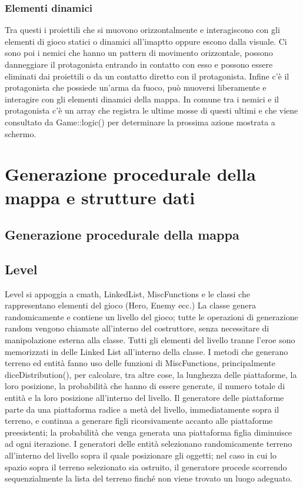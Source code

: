 \documentclass[12pt]{article}
\begin{document}
\subsubsection{Elementi dinamici}
Tra questi i proiettili che si muovono orizzontalmente e interagiscono con gli elementi di gioco statici o dinamici all'imaptto oppure escono dalla visuale.
Ci sono poi i nemici che hanno un pattern di movimento orizzontale, possono danneggiare il protagonista entrando in contatto con esso e possono essere eliminati dai proiettili o da un contatto diretto con il protagonista.
Infine c'è il protagonista che possiede un'arma da fuoco, può muoversi liberamente e interagire con gli elementi dinamici della mappa.
In comune tra i nemici e il protagonista c'è un array che registra le ultime mosse di questi ultimi e che viene consultato da Game::logic() per determinare la prossima azione mostrata a schermo.

\section*{Generazione procedurale della mappa e strutture dati}
\subsection{Generazione procedurale della mappa}
\subsection{Level}
    Level si appoggia a cmath, LinkedList, MiscFunctions e le classi che rappresentano elementi del gioco (Hero, Enemy ecc.)
    La classe genera randomicamente e contiene un livello del gioco; tutte le operazioni di generazione random vengono chiamate all'interno del costruttore, senza necessitare di manipolazione esterna alla classe.
    Tutti gli elementi del livello tranne l'eroe sono memorizzati in delle Linked List all'interno della classe.
    I metodi che generano terreno ed entità fanno uso delle funzioni di MiscFunctions, principalmente diceDistribution(), per calcolare, tra altre cose, la lunghezza delle piattaforme, la loro posizione, la probabilità che hanno di essere generate, il numero totale di entità e la loro posizione all'interno del livello.
    Il generatore delle piattaforme parte da una piattaforma radice a metà del livello, immediatamente sopra il terreno, e continua a generare figli ricorsivamente accanto alle piattaforme preesistenti; la probabilità che venga generata una piattaforma figlia diminuisce ad ogni iterazione.
    I generatori delle entità selezionano randomicamente terreno all'interno del livello sopra il quale posizionare gli oggetti; nel caso in cui lo spazio sopra il terreno selezionato sia ostruito, il generatore procede scorrendo sequenzialmente la lista del terreno finché non viene trovato un luogo adeguato.
\end{document}
